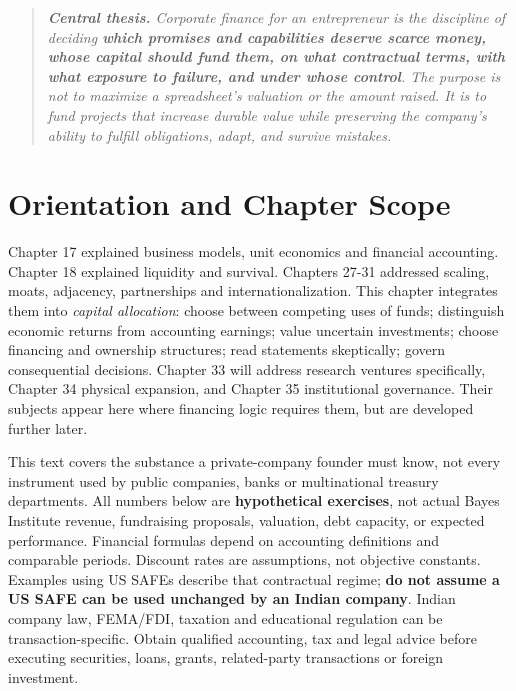 
\begin{quote}
\itshape
\textbf{Central thesis.} Corporate finance for an entrepreneur is the discipline of deciding \textbf{which promises and capabilities deserve scarce money, whose capital should fund them, on what contractual terms, with what exposure to failure, and under whose control}. The purpose is not to maximize a spreadsheet's valuation or the amount raised. It is to fund projects that increase durable value while preserving the company's ability to fulfill obligations, adapt, and survive mistakes.
\end{quote}

\section*{Orientation and Chapter Scope}

Chapter 17 explained business models, unit economics and financial accounting. Chapter 18 explained liquidity and survival. Chapters 27-31 addressed scaling, moats, adjacency, partnerships and internationalization. This chapter integrates them into \textit{capital allocation}: choose between competing uses of funds; distinguish economic returns from accounting earnings; value uncertain investments; choose financing and ownership structures; read statements skeptically; govern consequential decisions. Chapter 33 will address research ventures specifically, Chapter 34 physical expansion, and Chapter 35 institutional governance. Their subjects appear here where financing logic requires them, but are developed further later.

This text covers the substance a private-company founder must know, not every instrument used by public companies, banks or multinational treasury departments. All numbers below are \textbf{hypothetical exercises}, not actual Bayes Institute revenue, fundraising proposals, valuation, debt capacity, or expected performance. Financial formulas depend on accounting definitions and comparable periods. Discount rates are assumptions, not objective constants. Examples using US SAFEs describe that contractual regime; \textbf{do not assume a US SAFE can be used unchanged by an Indian company}. Indian company law, FEMA/FDI, taxation and educational regulation can be transaction-specific. Obtain qualified accounting, tax and legal advice before executing securities, loans, grants, related-party transactions or foreign investment.

